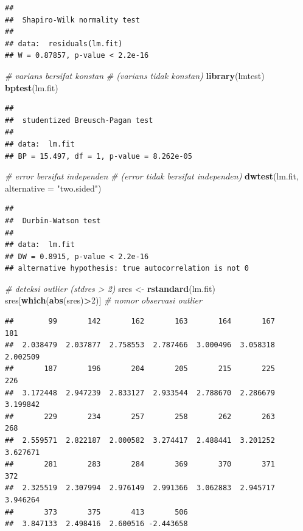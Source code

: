 \documentclass[]{book}
\newenvironment{Shaded}{\begin{snugshade}}{\end{snugshade}}
\newcommand{\CommentTok}[1]{\textcolor[rgb]{0.56,0.35,0.01}{\textit{#1}}}
\newcommand{\DataTypeTok}[1]{\textcolor[rgb]{0.13,0.29,0.53}{#1}}
\newcommand{\DecValTok}[1]{\textcolor[rgb]{0.00,0.00,0.81}{#1}}
\newcommand{\KeywordTok}[1]{\textcolor[rgb]{0.13,0.29,0.53}{\textbf{#1}}}
\newcommand{\NormalTok}[1]{#1}
\newcommand{\OperatorTok}[1]{\textcolor[rgb]{0.81,0.36,0.00}{\textbf{#1}}}
\newcommand{\StringTok}[1]{\textcolor[rgb]{0.31,0.60,0.02}{#1}}
\theoremstyle{definition}
\theoremstyle{definition}
\theoremstyle{definition}
\theoremstyle{remark}
\begin{document}
\begin{verbatim}
## 
##  Shapiro-Wilk normality test
## 
## data:  residuals(lm.fit)
## W = 0.87857, p-value < 2.2e-16
\end{verbatim}

\begin{Shaded}
\begin{Highlighting}[]
\CommentTok{# varians bersifat konstan }
\CommentTok{# (varians tidak konstan)}
\KeywordTok{library}\NormalTok{(lmtest)}
\KeywordTok{bptest}\NormalTok{(lm.fit)}
\end{Highlighting}
\end{Shaded}

\begin{verbatim}
## 
##  studentized Breusch-Pagan test
## 
## data:  lm.fit
## BP = 15.497, df = 1, p-value = 8.262e-05
\end{verbatim}

\begin{Shaded}
\begin{Highlighting}[]
\CommentTok{# error bersifat independen}
\CommentTok{# (error tidak bersifat independen)}
\KeywordTok{dwtest}\NormalTok{(lm.fit, }\DataTypeTok{alternative =} \StringTok{"two.sided"}\NormalTok{)}
\end{Highlighting}
\end{Shaded}

\begin{verbatim}
## 
##  Durbin-Watson test
## 
## data:  lm.fit
## DW = 0.8915, p-value < 2.2e-16
## alternative hypothesis: true autocorrelation is not 0
\end{verbatim}

\begin{Shaded}
\begin{Highlighting}[]
\CommentTok{# deteksi outlier (stdres > 2)}
\NormalTok{sres <-}\StringTok{ }\KeywordTok{rstandard}\NormalTok{(lm.fit)}
\NormalTok{sres[}\KeywordTok{which}\NormalTok{(}\KeywordTok{abs}\NormalTok{(sres)}\OperatorTok{>}\DecValTok{2}\NormalTok{)] }\CommentTok{# nomor observasi outlier}
\end{Highlighting}
\end{Shaded}

\begin{verbatim}
##        99       142       162       163       164       167       181 
##  2.038479  2.037877  2.758553  2.787466  3.000496  3.058318  2.002509 
##       187       196       204       205       215       225       226 
##  3.172448  2.947239  2.833127  2.933544  2.788670  2.286679  3.199842 
##       229       234       257       258       262       263       268 
##  2.559571  2.822187  2.000582  3.274417  2.488441  3.201252  3.627671 
##       281       283       284       369       370       371       372 
##  2.325519  2.307994  2.976149  2.991366  3.062883  2.945717  3.946264 
##       373       375       413       506 
##  3.847133  2.498416  2.600516 -2.443658
\end{verbatim}
\end{document}
